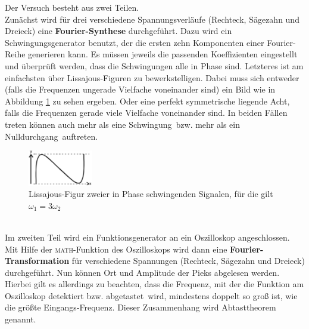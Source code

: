 Der Versuch besteht aus zwei Teilen. \\
Zunächst wird für drei verschiedene Spannungsverläufe (Rechteck, Sägezahn und Dreieck) eine \textbf{Fourier-Synthese} durchgeführt. Dazu wird ein Schwingungsgenerator benutzt, der die ersten zehn Komponenten einer Fourier-Reihe generieren kann. Es müssen jeweils die passenden Koeffizienten eingestellt und überprüft werden, dass die Schwingungen alle in Phase sind. Letzteres ist am einfachsten über Lissajous-Figuren zu bewerkstelligen. Dabei muss sich entweder (falls die Frequenzen ungerade Vielfache voneinander sind) ein Bild wie in Abbildung \ref{fig:Lissajous} zu sehen ergeben. Oder eine perfekt symmetrische liegende Acht, falls die Frequenzen gerade viele Vielfache voneinander sind. In beiden Fällen treten können auch mehr als eine \glqq Schwingung\grqq\ bzw. mehr als ein \glqq Nulldurchgang\grqq\ auftreten.
\begin{figure}[h!]
	\centering
	\includegraphics[width=0.25\textwidth]{Lissajous.pdf}
	\caption{Lissajous-Figur zweier in Phase schwingenden Signalen, für die gilt $\omega_1 = 3\omega_2$}
	\label{fig:Lissajous}
\end{figure} \\
Im zweiten Teil wird ein Funktionsgenerator an ein Oszilloskop angeschlossen. Mit Hilfe der \textsc{math}-Funktion des Oszilloskops wird dann eine \textbf{Fourier-Transformation} für verschiedene Spannungen (Rechteck, Sägezahn und Dreieck) durchgeführt. Nun können Ort und Amplitude der Pieks abgelesen werden. Hierbei gilt es allerdings zu beachten, dass die Frequenz, mit der die Funktion am Oszilloskop detektiert bzw. \glqq abgetastet\grqq\ wird, mindestens doppelt so groß ist, wie die größte Eingangs-Frequenz. Dieser Zusammenhang wird Abtasttheorem genannt.